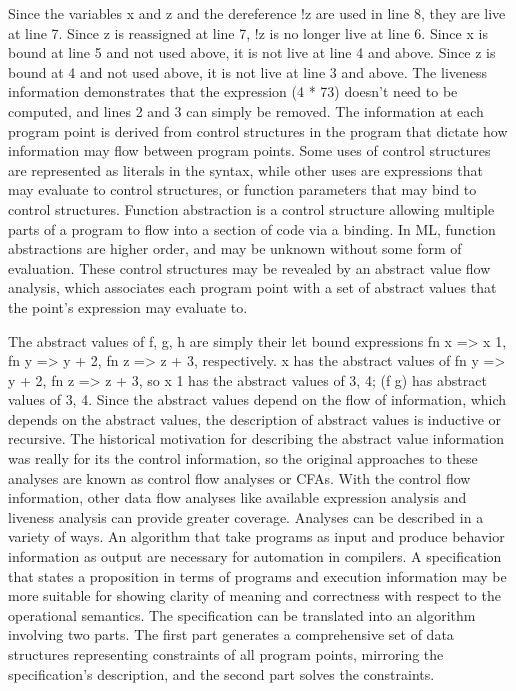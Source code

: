 \documentclass{article}
\begin{document}
  Since the variables x and z and the dereference !z are used in line 8, they are live at line 7.  Since z is reassigned at line 7, !z is no longer live at line 6.  Since x is bound at line 5 and not used above, it is not live at line 4 and above.  Since z is bound at 4 and not used above, it is not live at line 3 and above. The liveness information demonstrates that the expression (4 * 73) doesn't need to be computed, and lines 2 and 3 can simply be removed.
	The information at each program point is derived from control structures in the program that dictate how information may flow between program points.  Some uses of control structures are represented as literals in the syntax, while other uses are expressions that may evaluate to control structures, or function parameters that may bind to control structures.  Function abstraction is a control structure allowing multiple parts of a program to flow into a section of code via a binding.  In ML, function abstractions are higher order, and may be unknown without some form of evaluation.  These control structures may be revealed by an abstract value flow analysis, which associates each program point with a set of abstract values that the point's expression may evaluate to.


The abstract values of f, g, h are simply their let bound expressions {fn x => x 1}, {fn y => y + 2},  {fn z => z + 3}, respectively.  x has the abstract values of {fn y => y + 2, fn z => z + 3}, so x 1 has the abstract values of {3, 4}; (f g) has abstract values of {3, 4}.  Since the abstract values depend on the flow of information, which depends on the abstract values, the description of abstract values is inductive or recursive.  The historical motivation for describing the abstract value information was really for its the control information, so the original approaches to these analyses are known as control flow analyses or CFAs.  With the control flow information, other data flow analyses like available expression analysis and liveness analysis can provide greater coverage.
	Analyses can be described in a variety of ways.  An algorithm that take programs as input and produce behavior information as output are necessary for automation in compilers.  A specification that states a proposition in terms of programs and execution information may be more suitable for showing clarity of meaning and correctness with respect to the operational semantics.  The specification can be translated into an algorithm involving two parts.  The first part generates a comprehensive set of data structures representing constraints of all program points, mirroring the specification's description, and the second part solves the constraints.
\end{document}
